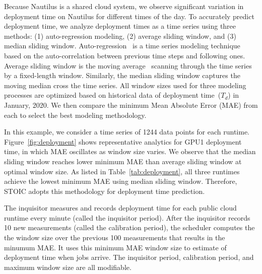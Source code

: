 Because Nautilus is a shared cloud system, 
we observe significant variation in deployment time on Nautilus for different
times of the day. To accurately predict deployment time, we analyze deployment
times as a time series using three methods: (1) auto-regression modeling, (2)
average sliding window, and (3) median sliding window.
Auto-regression~\cite{ref:autoreg} is a time series modeling technique based
on the auto-correlation between previous time steps and following ones.
Average sliding window is the moving average~\cite{ref:moveavg} scanning
through the time series by a fixed-length window. Similarly, the median
sliding window captures the moving median cross the time series. All window
sizes used for three modeling processes are optimized based on historical data
of deployment time~($T_d$) in January, 2020. We then compare the minimum Mean
Absolute Error (MAE) from each to select the best modeling methodology. 

In this example, we consider a time series of 1244 data points for each runtime.
Figure~\ref{fig:deployment} shows representative analytics for GPU1
deployment time, in which MAE oscillates as window size varies. We observe
that the median sliding window reaches lower minimum MAE than average sliding
window at optimal window size. As listed in Table~\ref{tab:deployment}, all
three runtimes achieve the lowest minimum MAE using median sliding window.
Therefore, STOIC adopts this methodology for deployment time prediction. 

The inquisitor measures and records deployment time for each public cloud 
runtime every minute (called the inquisitor period).
After the inquisitor records 10 new measurements (called the calibration period),
the scheduler computes the the window size over the previous 100 measurements
that results in the minumum MAE.  
It uses this minimum MAE window size to estimate of deployment time when jobs
arrive.
The inquisitor period, calibration period, and maximum window size are all modifiable.

 
